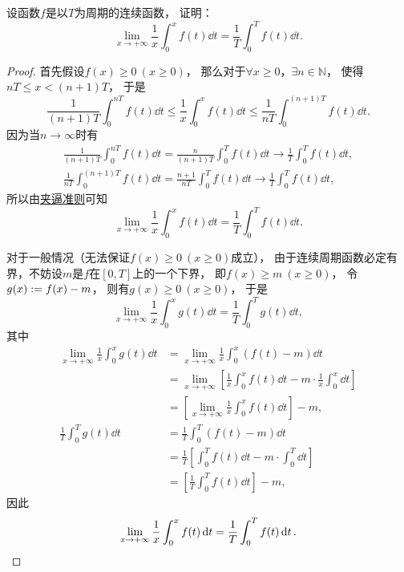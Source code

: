 \begin{example}
设函数\(f\)是以\(T\)为周期的连续函数，
证明：\begin{equation}
	\lim_{x\to+\infty} \frac1x \int_0^x f(t) \dd{t}
	= \frac1T \int_0^T f(t) \dd{t}.
\end{equation}
\begin{proof}
首先假设\(f(x)\geq0\ (x\geq0)\)，
那么对于\(\forall x\geq0\)，\(\exists n\in\mathbb{N}\)，
使得\(nT \leq x < (n+1)T\)，
于是\[
	\frac1{(n+1)T} \int_0^{nT} f(t) \dd{t}
	\leq \frac1x \int_0^x f(t) \dd{t}
	\leq \frac1{nT} \int_0^{(n+1)T} f(t) \dd{t}.
\]
因为当\(n\to\infty\)时有\begin{gather*}
	\frac1{(n+1)T} \int_0^{nT} f(t) \dd{t}
	= \frac{n}{(n+1)T} \int_0^T f(t) \dd{t}
	\to \frac1T \int_0^T f(t) \dd{t}, \\
	\frac1{nT} \int_0^{(n+1)T} f(t) \dd{t}
	= \frac{n+1}{nT} \int_0^T f(t) \dd{t}
	\to \frac1T \int_0^T f(t) \dd{t},
\end{gather*}
所以由\hyperref[theorem:函数极限.夹逼准则]{夹逼准则}可知\[
	\lim_{x\to+\infty} \frac1x \int_0^x f(t) \dd{t}
	= \frac1T \int_0^T f(t) \dd{t}.
\]

对于一般情况（无法保证\(f(x)\geq0\ (x\geq0)\)成立），
由于连续周期函数必定有界，不妨设\(m\)是\(f\)在\([0,T]\)上的一个下界，
即\(f(x) \geq m\ (x\geq0)\)，
令\(g(x) := f(x) - m\)，
则有\(g(x)\geq0\ (x\geq0)\)，
于是\[
	\lim_{x\to+\infty} \frac1x \int_0^x g(t) \dd{t}
	= \frac1T \int_0^T g(t) \dd{t},
\]
其中\begin{align*}
	\lim_{x\to+\infty} \frac1x \int_0^x g(t) \dd{t}
	&= \lim_{x\to+\infty} \frac1x \int_0^x (f(t) - m) \dd{t} \\
	&= \lim_{x\to+\infty} \left[
		\frac1x \int_0^x f(t) \dd{t}
		- m \cdot \frac1x \int_0^x \dd{t}
	\right] \\
	&= \left[ \lim_{x\to+\infty} \frac1x \int_0^x f(t) \dd{t} \right] - m, \\
	\frac1T \int_0^T g(t) \dd{t}
	&= \frac1T \int_0^T (f(t) - m) \dd{t} \\
	&= \frac1T \left[
		\int_0^T f(t) \dd{t}
		- m \cdot \int_0^T \dd{t}
	\right] \\
	&= \left[ \frac1T \int_0^T f(t) \dd{t} \right] - m,
\end{align*}
因此\[
	\lim_{x\to+\infty} \frac1x \int_0^x f(t) \dd{t}
	= \frac1T \int_0^T f(t) \dd{t}.
	\qedhere
\]
\end{proof}
\end{example}

